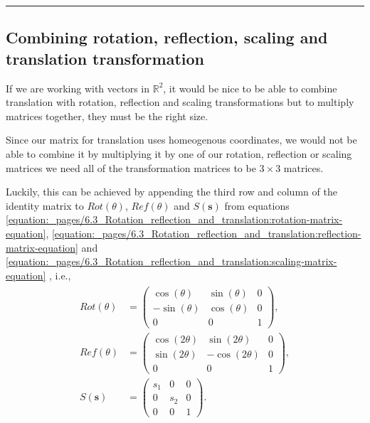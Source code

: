 \documentclass[letterpaper,10pt,english]{jupyterBook}
\begin{document}
\bigskip\hrule\bigskip



\subsection{Combining rotation, reflection, scaling and translation transformation}
\label{\detokenize{_pages/6.4_Translation:combining-rotation-reflection-scaling-and-translation-transformation}}
\sphinxAtStartPar
If we are working with vectors in \(\mathbb{R}^2\), it would be nice to be able to combine translation with rotation, reflection and scaling transformations \sphinxhyphen{} but to multiply matrices together, they must be the right size.

\sphinxAtStartPar
Since our matrix for translation uses homeogenous coordinates, we would not be able to combine it by multiplying it by one of our rotation, reflection or scaling matrices \sphinxhyphen{} we need all of the transformation matrices to be \(3 \times 3\) matrices.

\sphinxAtStartPar
Luckily, this can be achieved by appending the third row and column of the identity matrix to \(Rot(\theta)\), \(Re\!f(\theta)\) and \(S(\mathbf{s})\) from equations \eqref{equation:_pages/6.3_Rotation_reflection_and_translation:rotation-matrix-equation}, \eqref{equation:_pages/6.3_Rotation_reflection_and_translation:reflection-matrix-equation} and \eqref{equation:_pages/6.3_Rotation_reflection_and_translation:scaling-matrix-equation} , i.e.,
\begin{equation*}
\begin{split} \begin{align*}
    Rot(\theta) &= \begin{pmatrix}
        \cos(\theta) & \sin(\theta) & 0 \\
        -\sin(\theta) & \cos(\theta) & 0 \\
        0 & 0 & 1
    \end{pmatrix}, \\
    Re\!f(\theta) &= \begin{pmatrix}
        \cos(2\theta) & \sin(2\theta) & 0 \\
        \sin(2\theta) & -\cos(2\theta) & 0 \\
        0 & 0 & 1
    \end{pmatrix}, \\
    S(\mathbf{s}) &= \begin{pmatrix}
        s_1 & 0 & 0 \\
        0 & s_2 & 0 \\
        0 & 0 & 1
    \end{pmatrix}.
\end{align*} \end{split}
\end{equation*}
\end{document}
